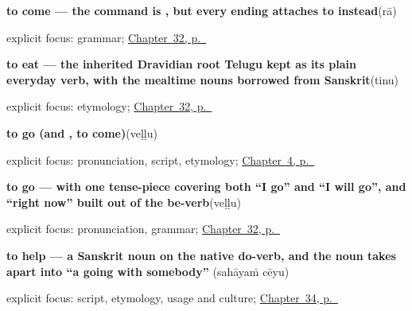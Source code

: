 \noindent\begin{minipage}[t]{\linewidth}
\raggedright
\textbf{to come — the command is , but every ending attaches to  instead}\enspace\emph{}\enspace(rā)\par
\footnotesize explicit focus: grammar; \hyperref[ch:te-core-verbs]{Chapter~32, p.~\pageref*{ch:te-core-verbs}}
\end{minipage}\par\smallskip

\noindent\begin{minipage}[t]{\linewidth}
\raggedright
\textbf{to eat — the inherited Dravidian root Telugu kept as its plain everyday verb, with the mealtime nouns borrowed from Sanskrit}\enspace\emph{}\enspace(tinu)\par
\footnotesize explicit focus: etymology; \hyperref[ch:te-core-verbs]{Chapter~32, p.~\pageref*{ch:te-core-verbs}}
\end{minipage}\par\smallskip

\noindent\begin{minipage}[t]{\linewidth}
\raggedright
\textbf{to go (and , to come)}\enspace\emph{}\enspace(veḷḷu)\par
\footnotesize explicit focus: pronunciation, script, etymology; \hyperref[ch:farewells]{Chapter~4, p.~\pageref*{ch:farewells}}
\end{minipage}\par\smallskip

\noindent\begin{minipage}[t]{\linewidth}
\raggedright
\textbf{to go — with one tense-piece covering both \textquotedblleft{}I go\textquotedblright{} and \textquotedblleft{}I will go\textquotedblright{}, and \textquotedblleft{}right now\textquotedblright{} built out of the be-verb}\enspace\emph{}\enspace(veḷḷu)\par
\footnotesize explicit focus: pronunciation, grammar; \hyperref[ch:te-core-verbs]{Chapter~32, p.~\pageref*{ch:te-core-verbs}}
\end{minipage}\par\smallskip

\noindent\begin{minipage}[t]{\linewidth}
\raggedright
\textbf{to help — a Sanskrit noun on the native do-verb, and the noun takes apart into \textquotedblleft{}a going with somebody\textquotedblright{}}\enspace\emph{ }\enspace(sahāyaṁ cēyu)\par
\footnotesize explicit focus: script, etymology, usage and culture; \hyperref[ch:te-verbs-between-people]{Chapter~34, p.~\pageref*{ch:te-verbs-between-people}}
\end{minipage}\par\smallskip

